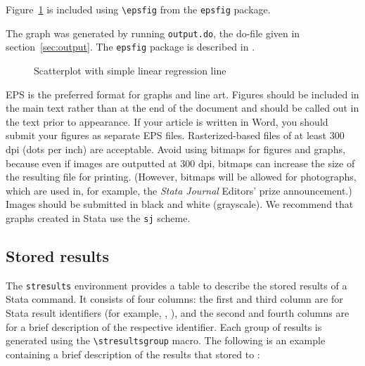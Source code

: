 Figure~\ref{fig} is included using \verb+\epsfig+ from the \texttt{epsfig}
package.  

\noindent
The graph was generated by running \texttt{output.do}, the
do-file given in section~\ref{sec:output}.  The \texttt{epsfig} package is
described in \citet*{latexcompanion}.

\clearpage

\begin{figure}[h!]
\begin{center}
\end{center}
\caption{Scatterplot with simple linear regression line}
\label{fig}
\end{figure}

{\smrm EPS} is the preferred format for graphs and line art. Figures should be
included in the main text rather than at the end of the document and should be
called out in the text prior to appearance. If your article is written in
Word, you should submit your figures as separate {\smrm EPS} files. Rasterized-based
files of at least 300 dpi (dots per inch) are acceptable. Avoid using bitmaps
for figures and graphs, because even if images are outputted at 300 dpi,
bitmaps can increase the size of the resulting file for printing. (However,
bitmaps will be allowed for photographs, which are used in, for example, the
{\sl Stata Journal} Editors' prize announcement.) Images should be submitted in
black and white (grayscale). We recommend that graphs created in Stata use the
{\tt sj} scheme.

\subsection{Stored results}

The \texttt{stresults} environment provides a table to describe the stored
results of a Stata command.  It consists of four columns: the first and third
column are for Stata result identifiers (for example, ,
), and the second and fourth columns are for a brief description
of the respective identifier.
%
Each group of results is generated using the \verb+\stresultsgroup+ macro.
%
The following is an example containing a brief description of the results that
 stored to :

\clearpage

